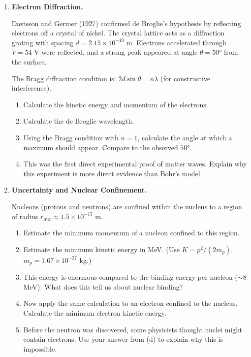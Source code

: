 \documentclass[12pt, a4paper]{book}
\begin{document}
\begin{deepbox}
\begin{enumerate}[label=\textbf{D\arabic*.}]

  \item \textbf{Electron Diffraction.}

        Davisson and Germer (1927) confirmed de Broglie's
        hypothesis by reflecting electrons off a crystal
        of nickel.
        The crystal lattice acts as a diffraction grating
        with spacing $d = 2.15\times10^{-10}$ m.
        Electrons accelerated through $V = 54$ V were
        reflected, and a strong peak appeared at angle
        $\theta = 50°$ from the surface.

        The Bragg diffraction condition is:
        $2d\sin\theta = n\lambda$ (for constructive interference).

        \begin{enumerate}[label=(\alph*)]
          \item Calculate the kinetic energy and momentum of
                the electrons.
          \item Calculate the de Broglie wavelength.
          \item Using the Bragg condition with $n=1$,
                calculate the angle at which a maximum should
                appear.
                Compare to the observed $50°$.
          \item This was the first direct experimental proof
                of matter waves.
                Explain why this experiment is more direct
                evidence than Bohr's model.
        \end{enumerate}

  \item \textbf{Uncertainty and Nuclear Confinement.}

        Nucleons (protons and neutrons) are confined within
        the nucleus to a region of radius
        $r_\text{nuc} \approx 1.5\times10^{-15}$ m.

        \begin{enumerate}[label=(\alph*)]
          \item Estimate the minimum momentum of a nucleon
                confined to this region.
          \item Estimate the minimum kinetic energy in MeV.
                (Use $K = p^2/(2m_p)$,
                $m_p = 1.67\times10^{-27}$ kg.)
          \item This energy is enormous compared to the
                binding energy per nucleon ($\sim 8$ MeV).
                What does this tell us about nuclear binding?
          \item Now apply the same calculation to an electron
                confined to the nucleus.
                Calculate the minimum electron kinetic energy.
          \item Before the neutron was discovered, some physicists
                thought nuclei might contain electrons.
                Use your answer from (d) to explain why
                this is impossible.
        \end{enumerate}


\end{enumerate}
\end{deepbox}
\end{document}
